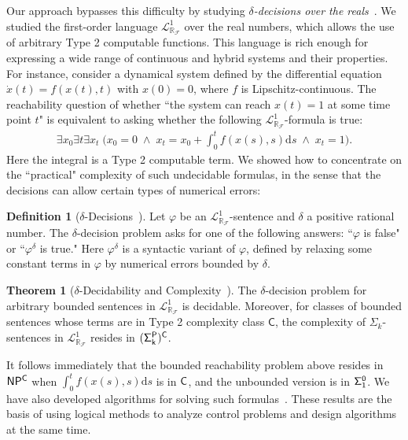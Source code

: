 \documentclass[10pt]{article}
\newcommand{\lrf}{\mathcal{L}_{\mathbb{R}_{\mathcal{F}}}}
\theoremstyle{definition}
\newtheorem{definition}{Definition}[section]
\newtheorem{theorem}{Theorem}[section]
\begin{document}
Our approach bypasses this difficulty by studying {\em $\delta$-decisions over the reals}~\cite{DBLP:conf/lics/GaoAC12}. We studied the first-order language $\lrf^1$ over the real numbers, which allows the use of arbitrary Type 2 computable functions. This language is rich enough for expressing a wide range of continuous and hybrid systems and their properties. For instance, consider a dynamical system defined by the differential equation $\dot{x}(t) = f(x(t),t)$ with $x(0)= 0$, where $f$ is Lipschitz-continuous. The reachability question of whether ``the system can reach $x(t)=1$ at some time point $t$" is equivalent to asking whether the following $\mathcal{L}^1_{\mathbb{R}_{\mathcal{F}}}$-formula is true:
\begin{eqnarray*}\exists x_0 \exists t \exists x_t\; \bigg(x_0 = 0 \;\wedge\; x_t = x_0 + \int_{0}^t f(x(s),s)\mathrm{d}s\; \wedge\; x_t = 1\bigg).\end{eqnarray*}
Here the integral is a Type 2 computable term. We showed how to concentrate on the ``practical" complexity of such undecidable formulas, in the sense that the decisions can allow certain types of numerical errors:
\begin{definition}[$\delta$-Decisions~\cite{DBLP:conf/lics/GaoAC12}] Let $\varphi$ be an $\lrf^1$-sentence and $\delta$ a positive rational number. The $\delta$-decision problem asks for one of the following answers: ``$\varphi$ is false" or ``$\varphi^{\delta}$ is true." Here $\varphi^{\delta}$ is a syntactic variant of $\varphi$, defined by relaxing some constant terms in $\varphi$ by numerical errors bounded by $\delta$. 
\end{definition}
\begin{theorem}[$\delta$-Decidability and Complexity~\cite{DBLP:conf/lics/GaoAC12}] The $\delta$-decision problem for arbitrary bounded sentences in $\lrf^1$ is decidable. Moreover, for classes of bounded sentences whose terms are in Type 2 complexity class $\mathsf{C}$, the complexity of $\Sigma_k$-sentences in $\lrf^1$ resides in ${\sf (\Sigma^P_k)^C}$. 
\end{theorem}
It follows immediately that the bounded reachability problem above resides in ${\sf NP^C}$ when $\int_{0}^t f(x(s),s)\mathrm{d}s$ is in ${\sf C}$, and the unbounded version is in ${\sf \Sigma^0_1}$. We have also developed algorithms for solving such formulas~\cite{DBLP:conf/fmcad/GaoKC13}. These results are the basis of using logical methods to analyze control problems and design algorithms at the same time. 
\end{document}
